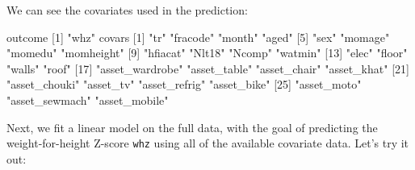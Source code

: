 \documentclass[12pt, krantz2,]{krantz}
\newenvironment{Shaded}{\begin{snugshade}}{\end{snugshade}}
\newcommand{\DecValTok}[1]{\textcolor[rgb]{0.06,0.06,0.06}{#1}}
\newcommand{\NormalTok}[1]{#1}
\newcommand{\StringTok}[1]{\textcolor[rgb]{0.5,0.5,0.5}{#1}}
\theoremstyle{definition}
\theoremstyle{definition}
\theoremstyle{definition}
\newcommand{\1}{\mathbbm{1}}
\begin{document}
We can see the covariates used in the prediction:

\begin{Shaded}
\begin{Highlighting}[]
\NormalTok{outcome}
\NormalTok{[}\DecValTok{1}\NormalTok{] }\StringTok{"whz"}
\NormalTok{covars}
\NormalTok{ [}\DecValTok{1}\NormalTok{] }\StringTok{"tr"}             \StringTok{"fracode"}        \StringTok{"month"}          \StringTok{"aged"}          
\NormalTok{ [}\DecValTok{5}\NormalTok{] }\StringTok{"sex"}            \StringTok{"momage"}         \StringTok{"momedu"}         \StringTok{"momheight"}     
\NormalTok{ [}\DecValTok{9}\NormalTok{] }\StringTok{"hfiacat"}        \StringTok{"Nlt18"}          \StringTok{"Ncomp"}          \StringTok{"watmin"}        
\NormalTok{[}\DecValTok{13}\NormalTok{] }\StringTok{"elec"}           \StringTok{"floor"}          \StringTok{"walls"}          \StringTok{"roof"}          
\NormalTok{[}\DecValTok{17}\NormalTok{] }\StringTok{"asset_wardrobe"} \StringTok{"asset_table"}    \StringTok{"asset_chair"}    \StringTok{"asset_khat"}    
\NormalTok{[}\DecValTok{21}\NormalTok{] }\StringTok{"asset_chouki"}   \StringTok{"asset_tv"}       \StringTok{"asset_refrig"}   \StringTok{"asset_bike"}    
\NormalTok{[}\DecValTok{25}\NormalTok{] }\StringTok{"asset_moto"}     \StringTok{"asset_sewmach"}  \StringTok{"asset_mobile"}  
\end{Highlighting}
\end{Shaded}

Next, we fit a linear model on the full data, with the goal of predicting the
weight-for-height Z-score \texttt{whz} using all of the available covariate data. Let's
try it out:
\end{document}
